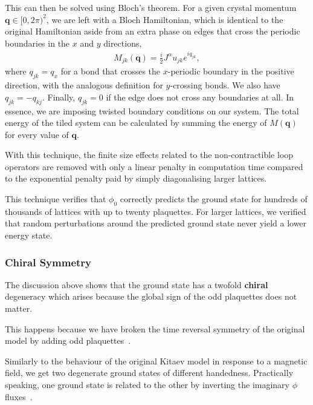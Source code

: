 This can then be solved using Bloch's theorem. For a given crystal momentum \(\textbf{q} \in [0,2\pi)^2\), we are left with a Bloch Hamiltonian, which is identical to the original Hamiltonian aside from an extra phase on edges that cross the periodic boundaries in the \(x\) and \(y\) directions, \[\begin{aligned}
    M_{jk}(\textbf{q}) =  \frac{i}{2} J^{\alpha} u_{jk} e^{i q_{jk}},\end{aligned}\] where \(q_{jk} = q_x\) for a bond that crosses the \(x\)-periodic boundary in the positive direction, with the analogous definition for \(y\)-crossing bonds. We also have \(q_{jk} = -q_{kj}\). Finally, \(q_{jk} = 0\) if the edge does not cross any boundaries at all. In essence, we are imposing twisted boundary conditions on our system. The total energy of the tiled system can be calculated by summing the energy of \(M( \textbf{q})\) for every value of \(\textbf{q}\).

With this technique, the finite size effects related to the non-contractible loop operators are removed with only a linear penalty in computation time compared to the exponential penalty paid by simply diagonalising larger lattices.

This technique verifies that \(\phi_0\) correctly predicts the ground state for hundreds of thousands of lattices with up to twenty plaquettes. For larger lattices, we verified that random perturbations around the predicted ground state never yield a lower energy state.

\hypertarget{chiral-symmetry}{%
\subsubsection{Chiral Symmetry}\label{chiral-symmetry}}

The discussion above shows that the ground state has a twofold \textbf{chiral} degeneracy which arises because the global sign of the odd plaquettes does not matter.

This happens because we have broken the time reversal symmetry of the original model by adding odd plaquettes~\autocite{Chua2011,yaoExactChiralSpin2007,ChuaPRB2011,Fiete2012,Natori2016,Wu2009,Peri2020,WangHaoranPRB2021}.

Similarly to the behaviour of the original Kitaev model in response to a magnetic field, we get two degenerate ground states of different handedness. Practically speaking, one ground state is related to the other by inverting the imaginary \(\phi\) fluxes~\autocite{yaoExactChiralSpin2007}.

